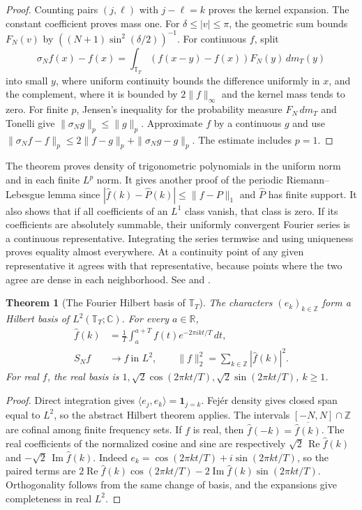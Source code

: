 \documentclass[11pt,oneside,openany]{book}
\newtheorem{theorem}{Theorem}[chapter]
\theoremstyle{definition}
\theoremstyle{remark}
\begin{document}
\begin{proof}
Counting pairs $(j,\ell)$ with $j-\ell=k$ proves the kernel expansion.
The constant coefficient proves mass one. For $\delta\le |v|\le\pi$,
the geometric sum bounds $F_N(v)$ by
$((N+1)\sin^2(\delta/2))^{-1}$. For continuous $f$, split
\[
 \sigma_N f(x)-f(x)
    =\int_{\mathbb T_T}(f(x-y)-f(x))F_N(y)\,dm_T(y)
\]
into small $y$, where uniform continuity bounds the difference
uniformly in $x$, and the complement, where it is bounded by
$2\|f\|_\infty$ and the kernel mass tends to zero. For finite $p$,
Jensen's inequality for the probability measure $F_N\,dm_T$ and
Tonelli give $\|\sigma_N g\|_p\le\|g\|_p$. Approximate $f$ by a
continuous $g$ and use
$\|\sigma_N f-f\|_p\le 2\|f-g\|_p+\|\sigma_N g-g\|_p$.
The estimate includes $p=1$.
\end{proof}

The theorem proves density of trigonometric polynomials in the uniform
norm and in each finite $L^p$ norm. It gives another proof of the
periodic Riemann--Lebesgue lemma since
$|\widehat f(k)-\widehat P(k)|\le\|f-P\|_1$ and $\widehat P$ has finite
support. It also shows that if all coefficients of an $L^1$ class
vanish, that class is zero. If its coefficients are absolutely
summable, their uniformly convergent Fourier series is a continuous
representative. Integrating the series termwise and using uniqueness
proves equality almost everywhere. At a continuity point of any given
representative it agrees with that representative, because points
where the two agree are dense in each neighborhood. See
\cite[Sections~1.2.4 and 3.1.3]{grafakos} and
\cite[Sections~11.14--11.15]{apostol}.

\begin{theorem}[The Fourier Hilbert basis of $\mathbb T_T$]
\label{p102:AN-06-C01-R03}
The characters $(e_k)_{k\in\mathbb Z}$ form a Hilbert basis of
$L^2(\mathbb T_T;\mathbb C)$. For every $a\in\mathbb R$,
\begin{align*}
 \widehat f(k)&=\frac1T\int_a^{a+T} f(t)e^{-2\pi i k t/T}\,dt,\\
 S_N f&\longrightarrow f\ \text{in }L^2,\qquad
 \|f\|_2^2=\sum_{k\in\mathbb Z}|\widehat f(k)|^2.
\end{align*}
For real $f$, the real basis is
$1,\sqrt 2\cos(2\pi k t/T),\sqrt 2\sin(2\pi k t/T)$, $k\ge1$.
\end{theorem}

\begin{proof}
Direct integration gives $\langle e_j,e_k\rangle=\mathbf 1_{j=k}$.
Fej\'er density gives closed span equal to $L^2$, so the abstract
Hilbert theorem applies. The intervals $[-N,N]\cap\mathbb Z$ are
cofinal among finite frequency sets. If $f$ is real, then
$\widehat f(-k)=\overline{\widehat f(k)}$. The real coefficients of
the normalized cosine and sine are respectively
$\sqrt 2\,\operatorname{Re}\widehat f(k)$ and
$-\sqrt 2\,\operatorname{Im}\widehat f(k)$. Indeed
$e_k=\cos(2\pi k t/T)+i\sin(2\pi k t/T)$, so the paired terms are
$2\operatorname{Re}\widehat f(k)\cos(2\pi k t/T)
 -2\operatorname{Im}\widehat f(k)\sin(2\pi k t/T)$.
Orthogonality follows from the same change of basis, and the
expansions give completeness in real $L^2$.
\end{proof}
\end{document}

